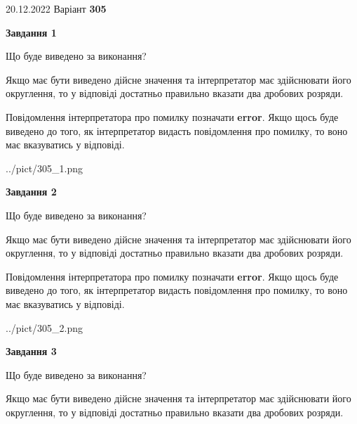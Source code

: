 \documentclass[12pt, ukrainian]{article}
\begin{document}
{20.12.2022 Варіант \No \textbf { 305 }\par}
{
\begin {Large}

{\begin {center}\textbf{Завдання 1}\end {center}}\par
Що буде виведено за виконання? \par

Якщо має бути виведено дійсне значення та інтерпретатор має здійснювати його округлення, 
то у відповіді достатньо правильно вказати два дробових розряди.

Повідомлення інтерпретатора про помилку позначати \textbf{error}.
Якщо щось буде виведено до того, як інтерпретатор видасть повідомлення про помилку, 
то воно має вказуватись у відповіді. \par

\begin{center}
	{../pict/305_1.png}
\end{center}
\newpage

{\begin {center}\textbf{Завдання 2}\end {center}}\par
Що буде виведено за виконання? \par

Якщо має бути виведено дійсне значення та інтерпретатор має здійснювати його округлення, 
то у відповіді достатньо правильно вказати два дробових розряди.

Повідомлення інтерпретатора про помилку позначати \textbf{error}.
Якщо щось буде виведено до того, як інтерпретатор видасть повідомлення про помилку, 
то воно має вказуватись у відповіді. \par

\begin{center}
	{../pict/305_2.png}
\end{center}
\newpage

{\begin {center}\textbf{Завдання 3}\end {center}}\par
Що буде виведено за виконання? \par

Якщо має бути виведено дійсне значення та інтерпретатор має здійснювати його округлення, 
то у відповіді достатньо правильно вказати два дробових розряди.


\end{Large}}
\end{document}

